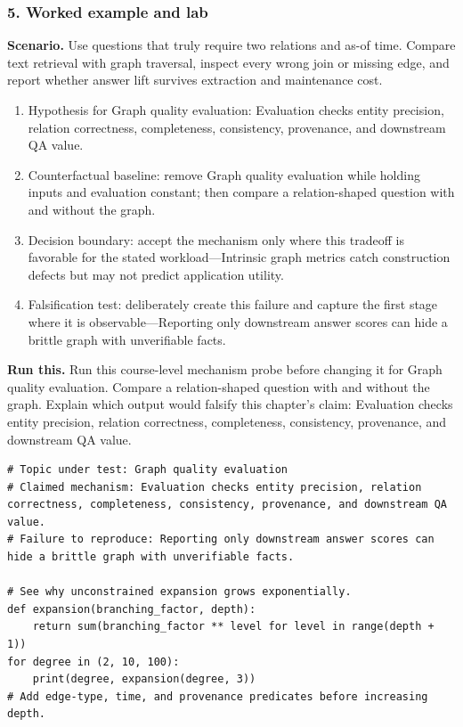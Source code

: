 \subsubsection*{5. Worked example and lab}
\textbf{Scenario.} Use questions that truly require two relations and as-of time. Compare text retrieval with graph traversal, inspect every wrong join or missing edge, and report whether answer lift survives extraction and maintenance cost.
\begin{enumerate}
\item Hypothesis for Graph quality evaluation: Evaluation checks entity precision, relation correctness, completeness, consistency, provenance, and downstream QA value.
\item Counterfactual baseline: remove Graph quality evaluation while holding inputs and evaluation constant; then compare a relation-shaped question with and without the graph.
\item Decision boundary: accept the mechanism only where this tradeoff is favorable for the stated workload—Intrinsic graph metrics catch construction defects but may not predict application utility.
\item Falsification test: deliberately create this failure and capture the first stage where it is observable—Reporting only downstream answer scores can hide a brittle graph with unverifiable facts.
\end{enumerate}
\textbf{Run this.} Run this course-level mechanism probe before changing it for Graph quality evaluation. Compare a relation-shaped question with and without the graph. Explain which output would falsify this chapter's claim: Evaluation checks entity precision, relation correctness, completeness, consistency, provenance, and downstream QA value.
\begin{Verbatim}[fontsize=\scriptsize]
# Topic under test: Graph quality evaluation
# Claimed mechanism: Evaluation checks entity precision, relation correctness, completeness, consistency, provenance, and downstream QA value.
# Failure to reproduce: Reporting only downstream answer scores can hide a brittle graph with unverifiable facts.

# See why unconstrained expansion grows exponentially.
def expansion(branching_factor, depth):
    return sum(branching_factor ** level for level in range(depth + 1))
for degree in (2, 10, 100):
    print(degree, expansion(degree, 3))
# Add edge-type, time, and provenance predicates before increasing depth.
\end{Verbatim}
